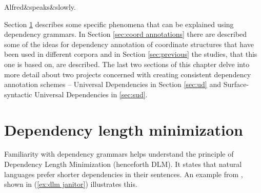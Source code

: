 \begin{exe}
    \ex
    \label{ex:tesniere today}
    \begin{dependency}[theme = simple, baseline=-\the\dimexpr\fontdimen22\textfont2\relax]
    \begin{deptext}
        Alfred\&speaks\&slowly.\\
    \end{deptext}
    \end{dependency}
\end{exe} 

Section \ref{sec:dlm} describes some specific phenomena that can be explained using dependency grammars. In Section \ref{sec:coord annotations} there are described some of the ideas for dependency annotation of coordinate structures that have been used in different corpora and in Section \ref{sec:previous} the studies, that this one is based on, are described. The last two sections of this chapter delve into more detail about two projects concerned with creating consistent dependency annotation schemes -- Universal Dependencies in Section \ref{sec:ud} and Surface-syntactic Universal Dependencies in \ref{sec:sud}. 

\section{Dependency length minimization}\label{sec:dlm}
Familiarity with dependency grammars helps understand the principle of Dependency Length Minimization (henceforth DLM). It states that natural languages prefer shorter dependencies in their sentences. An example from \cite{hp83}, shown in (\ref{ex:dlm janitor}) illustrates this.

